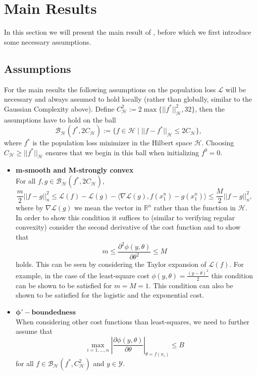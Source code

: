\section{Main Results}
In this section we will present the main result of \cite{wain17ada}, before which we first introduce some necessary assumptions.
\subsection{Assumptions}
For the main results the following assumptions on the population loss $\mathcal{L}$ will be necessary and always assumed to hold locally (rather than globally, similar to the Gaussian Complexity above). Define $C_{\mathcal{H}}^2 := 2\max\{||f^*||_{\mathcal{H}}^2, 32\}$, then the assumptions have to hold on the ball
\begin{equation}
\mathcal{B}_{\mathcal{H}}(f^*,2C_{\mathcal{H}}) := \{f\in\mathcal{H} \mid ||f-f^*||_{\mathcal{H}} \le 2C_{\mathcal{H}}\},
\end{equation}
where $f^*$ is the population loss minimizer in the Hilbert space $\mathcal{H}$. Choosing $C_{\mathcal{H}}\geq ||f^*||_{\mathcal{H}}$ ensures that we begin in this ball when initializing $f^0=0$.
\begin{itemize}
\item \textbf{m-smooth and M-strongly convex}\\
For all $f,g \in \mathcal{B}_{\mathcal{H}}(f^*,2C_{\mathcal{H}})$,
\begin{equation}
\frac{m}{2}||f-g||_n^2 \le \mathcal{L}(f) - \mathcal{L}(g) - \langle \nabla\mathcal{L}(g), f(x_1^n) - g(x_1^n)\rangle \le \frac{M}{2}||f-g||_n^2,
\end{equation}
where by $\nabla\mathcal{L}(g)$ we mean the vector in $\mathbb{R}^n$ rather than the function in $\mathcal{H}$. In order to show this condition it suffices to (similar to verifying regular convexity) consider the second derivative of the cost function and to show that
\begin{equation*}
m\le \frac{\partial^2\phi(y,\theta)}{\partial\theta^2} \le M
\end{equation*}
holds. This can be seen by considering the Taylor expansion of $\mathcal{L}(f)$. For example, in the case of the least-square cost $\phi(y,\theta)=\frac{(y-\theta)^2}{2}$ this condition can be shown to be satisfied for $m=M=1$. This condition can also be shown to be satisfied for the logistic and the exponential cost.

\item $\mathbf{\phi'-boundedness}$\\
When considering other cost functions than least-squares, we need to further assume that
\begin{equation}
\max_{i=1,...,n}\left\lvert \frac{\partial\phi(y,\theta)}{\partial \theta}\right\rvert_{\theta=f(x_i)} \le B
\end{equation}
for all $f\in \mathcal{B}_{\mathcal{H}}(f^*,C_{\mathcal{H}}^2)$ and $y\in \mathcal{Y}$.

\end{itemize}

